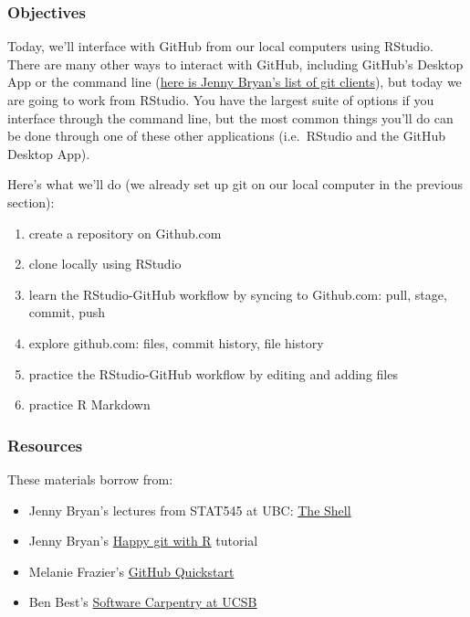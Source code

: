 \documentclass[]{book}
\providecommand{\tightlist}{%
  \setlength{\itemsep}{0pt}\setlength{\parskip}{0pt}}
\theoremstyle{definition}
\theoremstyle{definition}
\theoremstyle{definition}
\theoremstyle{remark}
\begin{document}
\subsubsection{Objectives}\label{objectives}

Today, we'll interface with GitHub from our local computers using
RStudio. There are many other ways to interact with GitHub, including
GitHub's Desktop App or the command line
(\href{http://stat545.com/git02_git-clients.html}{here is Jenny Bryan's
list of git clients}), but today we are going to work from RStudio. You
have the largest suite of options if you interface through the command
line, but the most common things you'll do can be done through one of
these other applications (i.e.~RStudio and the GitHub Desktop App).

Here's what we'll do (we already set up git on our local computer in the
previous section):

\begin{enumerate}
\def\labelenumi{\arabic{enumi}.}
\tightlist
\item
  create a repository on Github.com
\item
  clone locally using RStudio
\item
  learn the RStudio-GitHub workflow by syncing to Github.com: pull,
  stage, commit, push
\item
  explore github.com: files, commit history, file history
\item
  practice the RStudio-GitHub workflow by editing and adding files
\item
  practice R Markdown
\end{enumerate}

\subsubsection{Resources}\label{resources}

These materials borrow from:

\begin{itemize}
\tightlist
\item
  Jenny Bryan's lectures from STAT545 at UBC:
  \href{http://stat545.com/git09_shell.html}{The Shell}
\item
  Jenny Bryan's \href{http://happygitwithr.com}{Happy git with R}
  tutorial
\item
  Melanie Frazier's
  \href{https://rawgit.com/nazrug/Quickstart/master/GithubQuickstart.html}{GitHub
  Quickstart}
\item
  Ben Best's
  \href{http://remi-daigle.github.io/2016-04-15-UCSB/git/}{Software
  Carpentry at UCSB}
\end{itemize}
\end{document}
